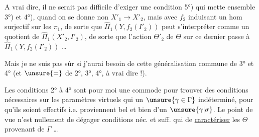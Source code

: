 A vrai dire, il ne serait pas difficile d'exiger une condition 5°) qui mette ensemble 3°) et 4°), quand on se donne non $X'_1\to X'_2$, mais
avec $f_2$  induisant un hom  surjectif sur les $\pi_1$, de sorte que $\widehat{\Pi}_1(Y,f_2(I'_2))$ peut s'interpréter comme un quotient de $\widehat{\Pi}_1(X'_2,I'_2)$, de sorte que l'action  $\Theta'_2$ de $\Theta$ sur ce dernier passe à $\widehat{\Pi}_1(Y,f_2(I'_2))$ \ldots

Mais je ne suis pas sûr si j'aurai besoin de cette généralisation commune de 3° et 4° (et $\unsure{=}$ de 2°, 3°, 4°, à vrai dire !).

Les conditions 2° à 4° sont pour moi  une \uline{} commode pour trouver des conditions nécessaires sur les paramètres virtuels qui  un $\unsure{\gamma\in\Gamma}$ indéterminé, pour qu'ils soient effectifs i.e. proviennent bel et bien d'un $\unsure{\gamma|\sigma}$. Le point de vue n'est nullement de dégager  conditions néc. et suff. qui  de \uline{caractériser} les $\Theta$ provenant de $\Gamma$ \ldots
{}
